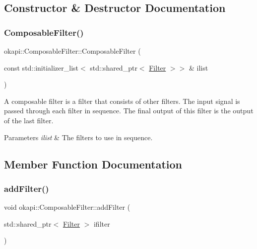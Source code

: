 \subsection{Constructor \& Destructor Documentation}
\mbox{\label{classokapi_1_1ComposableFilter_ab435425858bcf6710a9ffc1fdcd84fa0}} 
\subsubsection{\texorpdfstring{ComposableFilter()}{ComposableFilter()}}
{\footnotesize\ttfamily okapi\+::\+Composable\+Filter\+::\+Composable\+Filter (\begin{DoxyParamCaption}\item[{const std\+::initializer\+\_\+list$<$ std\+::shared\+\_\+ptr$<$ \mbox{\hyperlink{classokapi_1_1Filter}{Filter}} $>$$>$ \&}]{ilist }\end{DoxyParamCaption})}

A composable filter is a filter that consists of other filters. The input signal is passed through each filter in sequence. The final output of this filter is the output of the last filter.


\begin{DoxyParams}{Parameters}
{\em ilist} & The filters to use in sequence. \\
\hline
\end{DoxyParams}


\subsection{Member Function Documentation}
\mbox{\label{classokapi_1_1ComposableFilter_a5a051c89bddbccaaaffa83d868f6b289}} 
\subsubsection{\texorpdfstring{addFilter()}{addFilter()}}
{\footnotesize\ttfamily void okapi\+::\+Composable\+Filter\+::add\+Filter (\begin{DoxyParamCaption}\item[{std\+::shared\+\_\+ptr$<$ \mbox{\hyperlink{classokapi_1_1Filter}{Filter}} $>$}]{ifilter }\end{DoxyParamCaption})\hspace{0.3cm}{\ttfamily [virtual]}}

